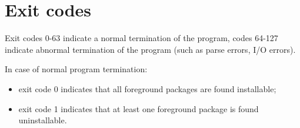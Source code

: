 
\section{Exit codes}

Exit codes 0-63 indicate a normal termination of the program, codes
64-127 indicate abnormal termination of the program (such as parse
errors, I/O errors).

In case of normal program termination:
\begin{itemize}
\item exit code 0 indicates that all foreground packages are found
  installable;
\item exit code 1 indicates that at least one foreground package is found
  uninstallable.
\end{itemize}

